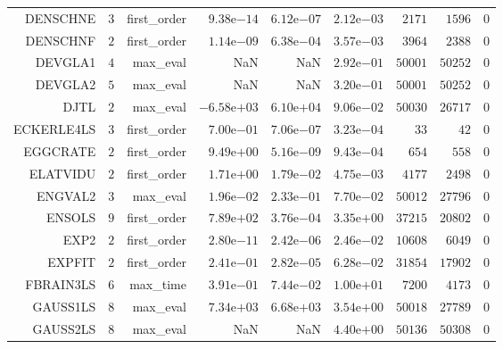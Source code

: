 \begin{longtable}{rrrrrrrrr}
DENSCHNE & \(     3\) & first\_order & \( 9.38\)e\(-14\) & \( 6.12\)e\(-07\) & \( 2.12\)e\(-03\) & \(  2171\) & \(  1596\) & \(     0\) \\
DENSCHNF & \(     2\) & first\_order & \( 1.14\)e\(-09\) & \( 6.38\)e\(-04\) & \( 3.57\)e\(-03\) & \(  3964\) & \(  2388\) & \(     0\) \\
DEVGLA1 & \(     4\) & max\_eval &       NaN &       NaN & \( 2.92\)e\(-01\) & \( 50001\) & \( 50252\) & \(     0\) \\
DEVGLA2 & \(     5\) & max\_eval &       NaN &       NaN & \( 3.20\)e\(-01\) & \( 50001\) & \( 50252\) & \(     0\) \\
DJTL & \(     2\) & max\_eval & \(-6.58\)e\(+03\) & \( 6.10\)e\(+04\) & \( 9.06\)e\(-02\) & \( 50030\) & \( 26717\) & \(     0\) \\
ECKERLE4LS & \(     3\) & first\_order & \( 7.00\)e\(-01\) & \( 7.06\)e\(-07\) & \( 3.23\)e\(-04\) & \(    33\) & \(    42\) & \(     0\) \\
EGGCRATE & \(     2\) & first\_order & \( 9.49\)e\(+00\) & \( 5.16\)e\(-09\) & \( 9.43\)e\(-04\) & \(   654\) & \(   558\) & \(     0\) \\
ELATVIDU & \(     2\) & first\_order & \( 1.71\)e\(+00\) & \( 1.79\)e\(-02\) & \( 4.75\)e\(-03\) & \(  4177\) & \(  2498\) & \(     0\) \\
ENGVAL2 & \(     3\) & max\_eval & \( 1.96\)e\(-02\) & \( 2.33\)e\(-01\) & \( 7.70\)e\(-02\) & \( 50012\) & \( 27796\) & \(     0\) \\
ENSOLS & \(     9\) & first\_order & \( 7.89\)e\(+02\) & \( 3.76\)e\(-04\) & \( 3.35\)e\(+00\) & \( 37215\) & \( 20802\) & \(     0\) \\
EXP2 & \(     2\) & first\_order & \( 2.80\)e\(-11\) & \( 2.42\)e\(-06\) & \( 2.46\)e\(-02\) & \( 10608\) & \(  6049\) & \(     0\) \\
EXPFIT & \(     2\) & first\_order & \( 2.41\)e\(-01\) & \( 2.82\)e\(-05\) & \( 6.28\)e\(-02\) & \( 31854\) & \( 17902\) & \(     0\) \\
FBRAIN3LS & \(     6\) & max\_time & \( 3.91\)e\(-01\) & \( 7.44\)e\(-02\) & \( 1.00\)e\(+01\) & \(  7200\) & \(  4173\) & \(     0\) \\
GAUSS1LS & \(     8\) & max\_eval & \( 7.34\)e\(+03\) & \( 6.68\)e\(+03\) & \( 3.54\)e\(+00\) & \( 50018\) & \( 27789\) & \(     0\) \\
GAUSS2LS & \(     8\) & max\_eval &       NaN &       NaN & \( 4.40\)e\(+00\) & \( 50136\) & \( 50308\) & \(     0\) \\

\end{longtable}
